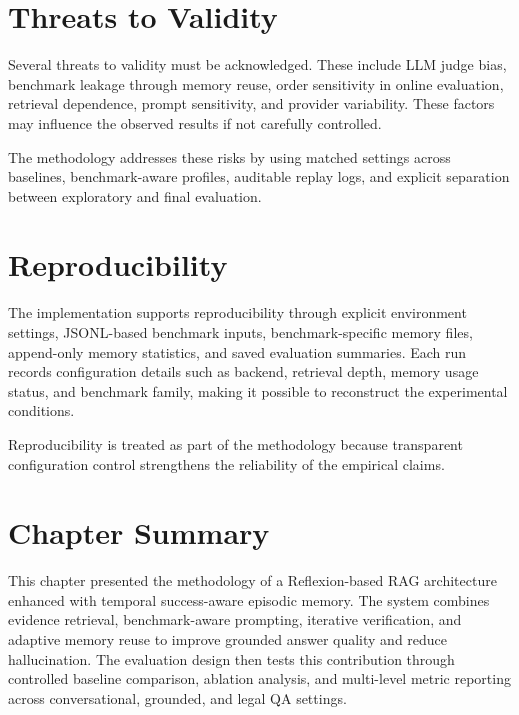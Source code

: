 
\section{Threats to Validity}
\label{sec:threats-to-validity}

Several threats to validity must be acknowledged. These include LLM judge bias, benchmark leakage through memory reuse, order sensitivity in online evaluation, retrieval dependence, prompt sensitivity, and provider variability. These factors may influence the observed results if not carefully controlled.

The methodology addresses these risks by using matched settings across baselines, benchmark-aware profiles, auditable replay logs, and explicit separation between exploratory and final evaluation.


\section{Reproducibility}
\label{sec:reproducibility}

The implementation supports reproducibility through explicit environment settings, JSONL-based benchmark inputs, benchmark-specific memory files, append-only memory statistics, and saved evaluation summaries. Each run records configuration details such as backend, retrieval depth, memory usage status, and benchmark family, making it possible to reconstruct the experimental conditions.

Reproducibility is treated as part of the methodology because transparent configuration control strengthens the reliability of the empirical claims.


\section{Chapter Summary}
\label{sec:chapter-summary}

This chapter presented the methodology of a Reflexion-based RAG architecture enhanced with temporal success-aware episodic memory. The system combines evidence retrieval, benchmark-aware prompting, iterative verification, and adaptive memory reuse to improve grounded answer quality and reduce hallucination. The evaluation design then tests this contribution through controlled baseline comparison, ablation analysis, and multi-level metric reporting across conversational, grounded, and legal QA settings.

